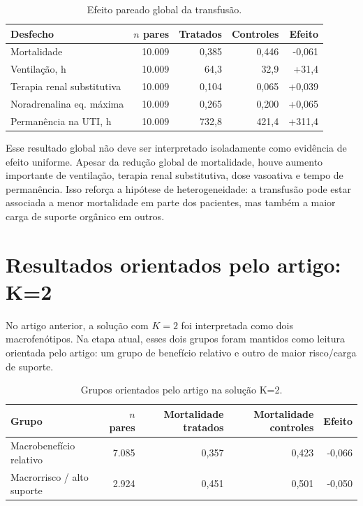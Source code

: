 \documentclass[12pt,a4paper]{article}
\begin{document}
\begin{table}[ht]
\centering
\caption{Efeito pareado global da transfus\~ao.}
\begin{tabular}{lrrrr}
\toprule
Desfecho & $n$ pares & Tratados & Controles & Efeito \\
\midrule
Mortalidade & 10.009 & 0,385 & 0,446 & -0,061 \\
Ventila\c{c}\~ao, h & 10.009 & 64,3 & 32,9 & +31,4 \\
Terapia renal substitutiva & 10.009 & 0,104 & 0,065 & +0,039 \\
Noradrenalina eq. m\'axima & 10.009 & 0,265 & 0,200 & +0,065 \\
Perman\^encia na UTI, h & 10.009 & 732,8 & 421,4 & +311,4 \\
\bottomrule
\end{tabular}
\end{table}

Esse resultado global n\~ao deve ser interpretado isoladamente como evid\^encia de efeito uniforme. Apesar da redu\c{c}\~ao global de mortalidade, houve aumento importante de ventila\c{c}\~ao, terapia renal substitutiva, dose vasoativa e tempo de perman\^encia. Isso refor\c{c}a a hip\'otese de heterogeneidade: a transfus\~ao pode estar associada a menor mortalidade em parte dos pacientes, mas tamb\'em a maior carga de suporte org\^anico em outros.

\section{Resultados orientados pelo artigo: K=2}

No artigo anterior, a solu\c{c}\~ao com $K=2$ foi interpretada como dois macrofen\'otipos. Na etapa atual, esses dois grupos foram mantidos como leitura orientada pelo artigo: um grupo de benef\'icio relativo e outro de maior risco/carga de suporte.

\begin{table}[ht]
\centering
\caption{Grupos orientados pelo artigo na solu\c{c}\~ao K=2.}
\begin{tabular}{lrrrr}
\toprule
Grupo & $n$ pares & Mortalidade tratados & Mortalidade controles & Efeito \\
\midrule
Macrobenef\'icio relativo & 7.085 & 0,357 & 0,423 & -0,066 \\
Macrorrisco / alto suporte & 2.924 & 0,451 & 0,501 & -0,050 \\
\bottomrule
\end{tabular}
\end{table}
\end{document}

